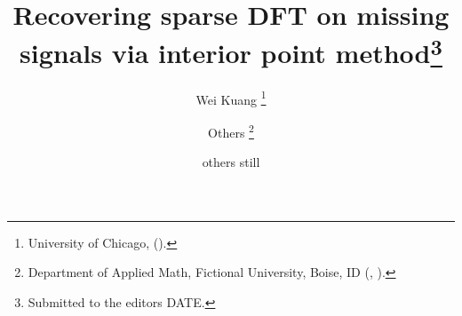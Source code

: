\title{Recovering sparse DFT on missing signals via interior point method\thanks{Submitted to the editors DATE.
}}

\author{Wei Kuang \thanks{University of Chicago, ().}
\and Others \thanks{Department of Applied Math, Fictional University, Boise, ID (, ).}
\and others still \footnotemark[3]}

